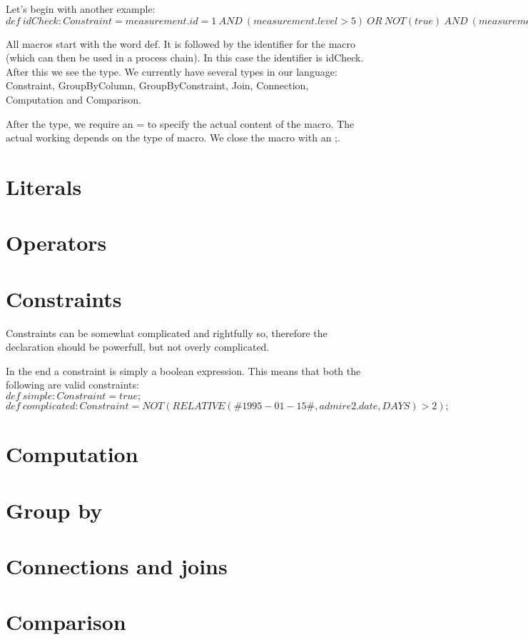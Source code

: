\documentclass[a4paper]{article}
\begin{document}
Let's begin with another example: \\

$def\ idCheck : Constraint = measurement.id = 1\ AND\ (measurement.level > 5)\ OR\ NOT(true)\ AND\ (measurement.level > measurement.value);$

All macros start with the word def. It is followed by the identifier for the macro (which can then be used in a process chain). In this case the identifier is idCheck. After this we see the type. We currently have several types in our language: Constraint, GroupByColumn, GroupByConstraint, Join, Connection, Computation and Comparison.

After the type, we require an = to specify the actual content of the macro. The actual working depends on the type of macro. We close the macro with an ;.

\section{Literals}


\section{Operators}


\section{Constraints}
Constraints can be somewhat complicated and rightfully so, therefore the declaration should be powerfull, but not overly complicated.

In the end a constraint is simply a boolean expression. This means that both the following are valid constraints: \\

$def\ simple : Constraint = true;$ \\

$def\ complicated : Constraint = NOT(RELATIVE(\#1995-01-15\#, admire2.date, DAYS) > 2);$

\section{Computation}


\section{Group by}


\section{Connections and joins}


\section{Comparison}

\end{document}
